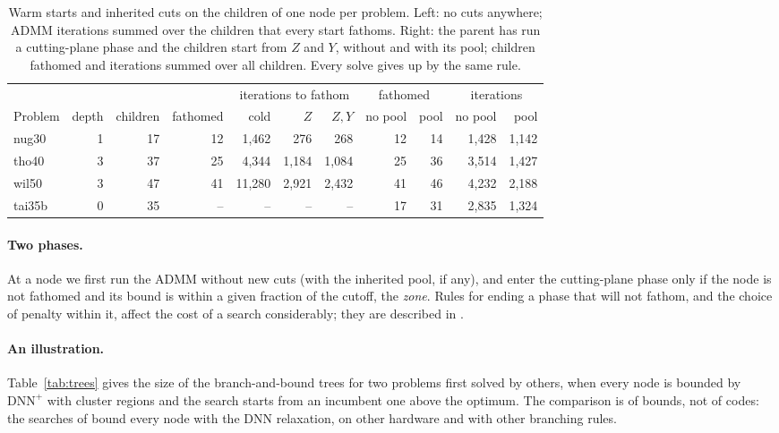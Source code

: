 \documentclass[11pt]{article}
\theoremstyle{remark}
\newcommand{\DNNp}{\mathrm{DNN}^{+}}
\begin{document}
\begin{table}[t]\centering
\caption{Warm starts and inherited cuts on the children of one node per
problem. Left: no cuts anywhere; ADMM iterations summed over the children that
every start fathoms. Right: the parent has run a cutting-plane phase and the
children start from $Z$ and $Y$, without and with its pool; children fathomed
and iterations summed over all children. Every solve gives up by the same
rule.}\label{tab:warm}
\small
\begin{tabular}{lrr@{\quad}rrrr@{\quad}rrrr}
\toprule
 & & & & \multicolumn{3}{c}{iterations to fathom} & \multicolumn{2}{c}{fathomed} & \multicolumn{2}{c}{iterations}\\
Problem & depth & children & fathomed & cold & $Z$ & $Z,Y$ & no pool & pool & no pool & pool\\
\midrule
nug30 & 1 & 17 & 12 & 1,462 & 276 & 268 & 12 & 14 & 1,428 & 1,142\\
tho40 & 3 & 37 & 25 & 4,344 & 1,184 & 1,084 & 25 & 36 & 3,514 & 1,427\\
wil50 & 3 & 47 & 41 & 11,280 & 2,921 & 2,432 & 41 & 46 & 4,232 & 2,188\\
tai35b & 0 & 35 & -- & -- & -- & -- & 17 & 31 & 2,835 & 1,324\\
\bottomrule
\end{tabular}
\end{table}

\paragraph{Two phases.} At a node we first run the ADMM without new cuts (with
the inherited pool, if any), and enter the cutting-plane phase only if the node
is not fathomed and its bound is within a given fraction of the cutoff, the
\emph{zone}. Rules for ending a phase that will not fathom, and the choice of
penalty within it, affect the cost of a search considerably; they are described
in \cite{companion}.

\paragraph{An illustration.} Table~\ref{tab:trees} gives the size of the
branch-and-bound trees for two problems first solved by others, when every node
is bounded by $\DNNp$ with cluster regions and the search starts from an
incumbent one above the optimum. The comparison is of bounds, not of codes: the
searches of \cite{fujii} bound every node with the DNN relaxation, on other
hardware and with other branching rules.
\end{document}
